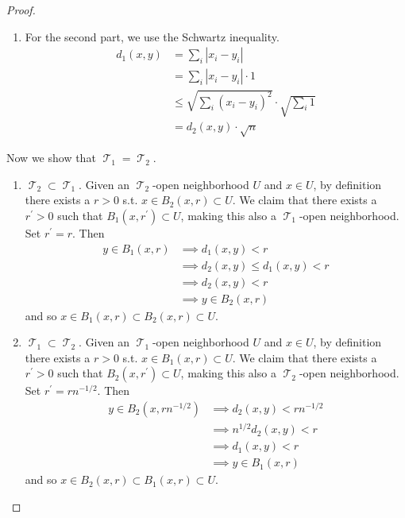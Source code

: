 \documentclass{article}
\DeclareMathOperator{\T}{\mathscr{T}}
\begin{document}
\begin{proof}
\begin{enumerate}
          \item For the second part, we use the Schwartz inequality. 
          \begin{align}
            d_1 (x, y) & = \sum_i |x_i - y_i| \\ 
                       & = \sum_i |x_i - y_i| \cdot 1 \\
                       & \leq \sqrt{\sum_i (x_i - y_i)^2} \cdot \sqrt{\sum_i 1} \\
                       & = d_2 (x, y) \cdot \sqrt{n}
          \end{align}
        \end{enumerate}
        Now we show that $\T_1 = \T_2$. 
        \begin{enumerate} 
          \item $\T_2 \subset \T_1$. Given an $\T_2$-open neighborhood $U$ and $x \in U$, by definition there exists a $r > 0$ s.t. $x \in B_2 (x, r) \subset U$. We claim that there exists a $r^\prime > 0$ such that $B_1 (x, r^\prime) \subset U$, making this also a $\T_1$-open neighborhood. Set $r^\prime = r$. Then 
          \begin{align}
            y \in B_1 (x, r) & \implies d_1 (x, y) < r \\
                             & \implies d_2 (x, y) \leq d_1 (x, y) < r \\
                             & \implies d_2 (x, y) < r \\
                             & \implies y \in B_2 (x, r)
          \end{align}
          and so $x \in B_1 (x, r) \subset B_2 (x, r) \subset U$. 

          \item $\T_1 \subset \T_2$. Given an $\T_1$-open neighborhood $U$ and $x \in U$, by definition there exists a $r > 0$ s.t. $x \in B_1 (x, r) \subset U$. We claim that there exists a $r^\prime > 0$ such that $B_2 (x, r^\prime) \subset U$, making this also a $\T_2$-open neighborhood. Set $r^\prime = r n^{-1/2}$. Then 
          \begin{align}
            y \in B_2 (x, r n^{-1/2}) & \implies d_2 (x, y) < r n^{-1/2} \\
                                      & \implies n^{1/2} d_2 (x, y) < r \\ 
                                      & \implies d_1 (x, y) < r \\
                                      & \implies y \in B_1 (x, r) 
          \end{align}
          and so $x \in B_2 (x, r) \subset B_1 (x, r) \subset U$. 
        \end{enumerate}  
      \end{proof}
\end{document}
